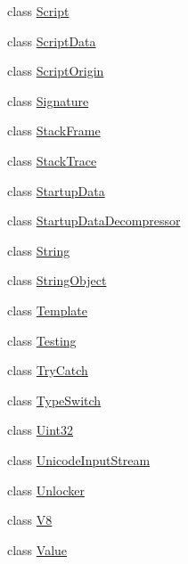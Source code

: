 \begin{DoxyCompactItemize}
\item 
class \hyperlink{classv8_1_1_script}{Script}
\item 
class \hyperlink{classv8_1_1_script_data}{Script\+Data}
\item 
class \hyperlink{classv8_1_1_script_origin}{Script\+Origin}
\item 
class \hyperlink{classv8_1_1_signature}{Signature}
\item 
class \hyperlink{classv8_1_1_stack_frame}{Stack\+Frame}
\item 
class \hyperlink{classv8_1_1_stack_trace}{Stack\+Trace}
\item 
class \hyperlink{classv8_1_1_startup_data}{Startup\+Data}
\item 
class \hyperlink{classv8_1_1_startup_data_decompressor}{Startup\+Data\+Decompressor}
\item 
class \hyperlink{classv8_1_1_string}{String}
\item 
class \hyperlink{classv8_1_1_string_object}{String\+Object}
\item 
class \hyperlink{classv8_1_1_template}{Template}
\item 
class \hyperlink{classv8_1_1_testing}{Testing}
\item 
class \hyperlink{classv8_1_1_try_catch}{Try\+Catch}
\item 
class \hyperlink{classv8_1_1_type_switch}{Type\+Switch}
\item 
class \hyperlink{classv8_1_1_uint32}{Uint32}
\item 
class \hyperlink{classv8_1_1_unicode_input_stream}{Unicode\+Input\+Stream}
\item 
class \hyperlink{classv8_1_1_unlocker}{Unlocker}
\item 
class \hyperlink{classv8_1_1_v8}{V8}
\item 
class \hyperlink{classv8_1_1_value}{Value}
\end{DoxyCompactItemize}
